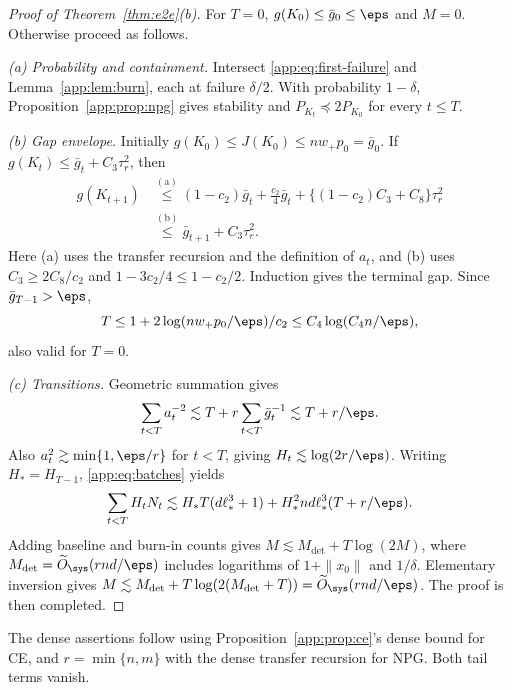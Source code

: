 \begin{proof}[Proof of Theorem~\ref{thm:e2e}(b)]
For $T=0$, $g(K_0)\le\bar g_0\le\eps$ and $M=0$.
Otherwise proceed as follows.

\emph{(a) Probability and containment.}
Intersect \eqref{app:eq:first-failure} and Lemma~\ref{app:lem:burn},
each at failure $\delta/2$.
With probability $1-\delta$, Proposition~\ref{app:prop:npg}
gives stability and $P_{K_t}\preceq2P_{K_0}$ for every $t\le T$.

\emph{(b) Gap envelope.}
Initially $g(K_0)\le J(K_0)\le nw_+p_0=\bar g_0$.
If $g(K_t)\le\bar g_t+C_3\tau_r^2$, then
\[
 \begin{split}
 g(K_{t+1})
 &\overset{\mathrm{(a)}}{\le}
 (1-c_2)\bar g_t+\frac{c_2}{4}\bar g_t+
            \{(1-c_2)C_3+C_8\}\tau_r^2\\
 &\overset{\mathrm{(b)}}{\le}\bar g_{t+1}+C_3\tau_r^2.
 \end{split}
\]
Here (a) uses the transfer recursion and the definition of $a_t$,
and (b) uses $C_3\ge2C_8/c_2$ and $1-3c_2/4\le1-c_2/2$.
Induction gives the terminal gap. Since $\bar g_{T-1}>\eps$,
\[
 T\le1+2\log(nw_+p_0/\eps)/c_2\le C_4\log(C_4n/\eps),
\]
also valid for $T=0$.

\emph{(c) Transitions.}
Geometric summation gives
\[
 \sum_{t<T}a_t^{-2}
 \lesssim T+r\sum_{t<T}\bar g_t^{-1}
 \lesssim T+r/\eps .
\]
Also $a_t^2\gtrsim\min\{1,\eps/r\}$ for $t<T$, giving
$H_t\lesssim\log(2r/\eps)$.
Writing $H_*=H_{T-1}$, \eqref{app:eq:batches} yields
\[
 \sum_{t<T}H_tN_t
 \lesssim H_*T(d\ell_*^3+1)
              +H_*^2nd\ell_*^3(T+r/\eps).
\]
Adding baseline and burn-in counts gives
$M\lesssim M_{\mathrm{det}}+T\log(2M)$, where
$M_{\mathrm{det}}=\widetilde O_{\sys}(rnd/\eps)$ includes logarithms
of $1+\|x_0\|$ and $1/\delta$.
Elementary inversion gives
$M\lesssim M_{\mathrm{det}}+T\log(2(M_{\mathrm{det}}+T))
=\widetilde O_{\sys}(rnd/\eps)$.
The proof is then completed.
\end{proof}

The dense assertions follow using Proposition~\ref{app:prop:ce}'s
dense bound for CE, and $r=\min\{n,m\}$ with the dense transfer
recursion for NPG. Both tail terms vanish.



